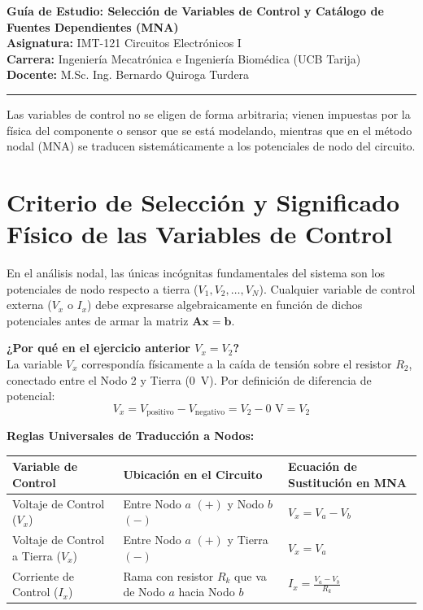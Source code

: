 \documentclass[11pt, a4paper]{article}
\begin{document}
\begin{center}
    {\LARGE \textbf{Guía de Estudio: Selección de Variables de Control y Catálogo de Fuentes Dependientes (MNA)}} \\[0.4cm]
    \normalsize
    \textbf{Asignatura:} IMT-121 Circuitos Electrónicos I \\
    \textbf{Carrera:} Ingeniería Mecatrónica e Ingeniería Biomédica (UCB Tarija) \\
    \textbf{Docente:} M.Sc. Ing. Bernardo Quiroga Turdera
    \vspace{0.4cm}
\end{center}
\hrule
\vspace{0.5cm}

\noindent Las variables de control no se eligen de forma arbitraria; vienen impuestas por la física del componente o sensor que se está modelando, mientras que en el método nodal (MNA) se traducen sistemáticamente a los potenciales de nodo del circuito.

\section*{Criterio de Selección y Significado Físico de las Variables de Control}
En el análisis nodal, las únicas incógnitas fundamentales del sistema son los potenciales de nodo respecto a tierra ($V_1, V_2, \dots, V_N$). Cualquier variable de control externa ($V_x$ o $I_x$) debe expresarse algebraicamente en función de dichos potenciales antes de armar la matriz $\mathbf{A}\mathbf{x} = \mathbf{b}$.

\textbf{¿Por qué en el ejercicio anterior $V_x = V_2$?} \\
La variable $V_x$ correspondía físicamente a la caída de tensión sobre el resistor $R_2$, conectado entre el Nodo 2 y Tierra (\qty{0}{\volt}). Por definición de diferencia de potencial:
\begin{equation}
    V_x = V_{\text{positivo}} - V_{\text{negativo}} = V_2 - 0\text{ V} = V_2
\end{equation}

\vspace{0.2cm}
\textbf{Reglas Universales de Traducción a Nodos:}
\begin{table}[h!]
    \centering
    \renewcommand{\arraystretch}{1.5}
    \begin{tabularx}{\textwidth}{@{}lXl@{}}
        \toprule
        \rowcolor{ucbblue!10}
        \textbf{Variable de Control} & \textbf{Ubicación en el Circuito} & \textbf{Ecuación de Sustitución en MNA} \\
        \midrule
        Voltaje de Control ($V_x$) & Entre Nodo $a$ $(+)$ y Nodo $b$ $(-)$ & $V_x = V_a - V_b$ \\
        Voltaje de Control a Tierra ($V_x$) & Entre Nodo $a$ $(+)$ y Tierra $(-)$ & $V_x = V_a$ \\
        Corriente de Control ($I_x$) & Rama con resistor $R_k$ que va de Nodo $a$ hacia Nodo $b$ & $I_x = \frac{V_a - V_b}{R_k}$ \\
        \bottomrule
    \end{tabularx}
\end{table}
\end{document}
